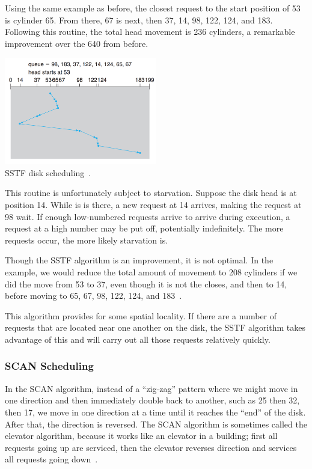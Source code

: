 Using the same example as before, the closest request to the start position of 53 is cylinder 65. From there, 67 is next, then 37, 14, 98, 122, 124, and 183. Following this routine, the total head movement is 236 cylinders, a remarkable improvement over the 640 from before.

\begin{center}
	\includegraphics[width=0.5\textwidth]{images/disk-sstf.png}\\
	SSTF disk scheduling~\cite{osc}.
\end{center}

This routine is unfortunately subject to starvation. Suppose the disk head is at position 14. While is is there, a new request at 14 arrives, making the request at 98 wait. If enough low-numbered requests arrive to arrive during execution, a request at a high number may be put off, potentially indefinitely. The more requests occur, the more likely starvation is.

Though the SSTF algorithm is an improvement, it is not optimal. In the example, we would reduce the total amount of movement to 208 cylinders if we did the move from 53 to 37, even though it is not the closes, and then to 14, before moving to 65, 67, 98, 122, 124, and 183~\cite{osc}.

This algorithm provides for some spatial locality. If there are a number of requests that are located near one another on the disk, the SSTF algorithm takes advantage of this and will carry out all those requests relatively quickly.

\subsubsection*{SCAN Scheduling}
In the SCAN algorithm, instead of a ``zig-zag'' pattern where we might move in one direction and then immediately double back to another, such as 25 then 32, then 17, we move in one direction at a time until it reaches the ``end'' of the disk. After that, the direction is reversed. The SCAN algorithm is sometimes called the elevator algorithm, because it works like an elevator in a building; first all requests going up are serviced, then the elevator reverses direction and services all requests going down~\cite{osc}.

